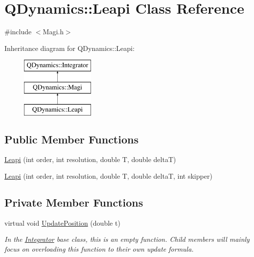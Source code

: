 \hypertarget{classQDynamics_1_1Leapi}{}\section{Q\+Dynamics\+:\+:Leapi Class Reference}
\label{classQDynamics_1_1Leapi}


{\ttfamily \#include $<$Magi.\+h$>$}

Inheritance diagram for Q\+Dynamics\+:\+:Leapi\+:\begin{figure}[H]
\begin{center}
\leavevmode
\includegraphics[height=3.000000cm]{classQDynamics_1_1Leapi}
\end{center}
\end{figure}
\subsection*{Public Member Functions}
\begin{DoxyCompactItemize}
\item 
\hyperlink{classQDynamics_1_1Leapi_aa6feac37d39339e26f89626f7bdbc8f0}{Leapi} (int order, int resolution, double T, double deltaT)
\item 
\hyperlink{classQDynamics_1_1Leapi_a008a9a757055debd2e1da2b5ac64a746}{Leapi} (int order, int resolution, double T, double deltaT, int skipper)
\end{DoxyCompactItemize}
\subsection*{Private Member Functions}
\begin{DoxyCompactItemize}
\item 
virtual void \hyperlink{classQDynamics_1_1Leapi_ada2b4935513fa7e0cb4f78ade9f2fd0e}{Update\+Position} (double t)
\begin{DoxyCompactList}\small\item\em In the \hyperlink{classQDynamics_1_1Integrator}{Integrator} base class, this is an empty function. Child members will mainly focus on overloading this function to their own update formula. \end{DoxyCompactList}\end{DoxyCompactItemize}
